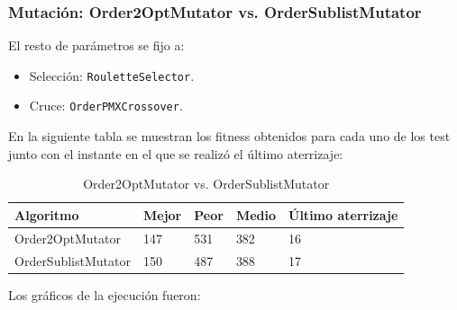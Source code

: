 \documentclass[a4paper,12pt,titlepage]{article}
\begin{document}
\newpage

\subsubsection{Mutación: Order2OptMutator vs. OrderSublistMutator}

El resto de parámetros se fijo a:

\begin{itemize}[noitemsep]
	\item Selección: \lstinline|RouletteSelector|.
	\item Cruce: \lstinline|OrderPMXCrossover|.
\end{itemize}

En la siguiente tabla se muestran los fitness obtenidos para cada uno de los test junto con el instante en el que se realizó el último aterrizaje:

\begin{table}[!ht]
\centering
\begin{tabular}{@{}lllll@{}}
\toprule
Algoritmo           & Mejor & Peor & Medio & Último aterrizaje \\ \midrule
Order2OptMutator    & 147   & 531  & 382   & 16                \\
OrderSublistMutator & 150   & 487  & 388   & 17                \\ \bottomrule
\end{tabular}
\caption{Order2OptMutator vs. OrderSublistMutator}
\end{table}

Los gráficos de la ejecución fueron:
\end{document}
